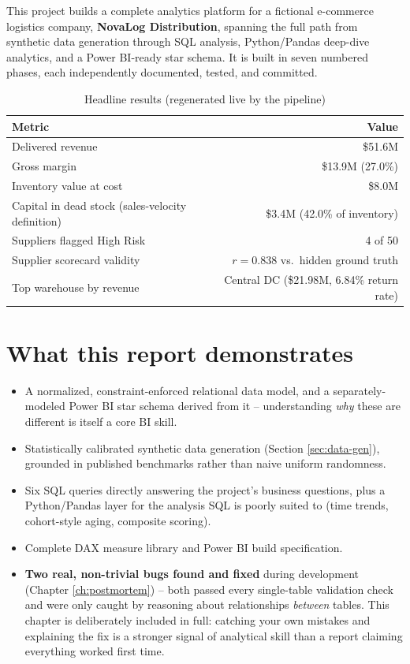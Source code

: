 \documentclass[11pt,a4paper]{report}
\begin{document}
This project builds a complete analytics platform for a fictional
e-commerce logistics company, \textbf{NovaLog Distribution}, spanning the
full path from synthetic data generation through SQL analysis, Python/Pandas
deep-dive analytics, and a Power BI-ready star schema. It is built in seven
numbered phases, each independently documented, tested, and committed.

\begin{table}[H]
\centering
\caption{Headline results (regenerated live by the pipeline)}
\begin{tabular}{lr}
\toprule
\textbf{Metric} & \textbf{Value} \\
\midrule
Delivered revenue & \$51.6M \\
Gross margin & \$13.9M (27.0\%) \\
Inventory value at cost & \$8.0M \\
Capital in dead stock (sales-velocity definition) & \$3.4M (42.0\% of inventory) \\
Suppliers flagged High Risk & 4 of 50 \\
Supplier scorecard validity & $r = 0.838$ vs.\ hidden ground truth \\
Top warehouse by revenue & Central DC (\$21.98M, 6.84\% return rate) \\
\bottomrule
\end{tabular}
\end{table}

\section*{What this report demonstrates}
\begin{itemize}[leftmargin=1.4em]
  \item A normalized, constraint-enforced relational data model, and a
        separately-modeled Power BI star schema derived from it --
        understanding \emph{why} these are different is itself a core BI
        skill.
  \item Statistically calibrated synthetic data generation (Section
        \ref{sec:data-gen}), grounded in published benchmarks rather than
        naive uniform randomness.
  \item Six SQL queries directly answering the project's business
        questions, plus a Python/Pandas layer for the analysis SQL is
        poorly suited to (time trends, cohort-style aging, composite
        scoring).
  \item Complete DAX measure library and Power BI build specification.
  \item \textbf{Two real, non-trivial bugs found and fixed} during
        development (Chapter \ref{ch:postmortem}) -- both passed every
        single-table validation check and were only caught by reasoning
        about relationships \emph{between} tables. This chapter is
        deliberately included in full: catching your own mistakes and
        explaining the fix is a stronger signal of analytical skill than a
        report claiming everything worked first time.
\end{itemize}
\end{document}
